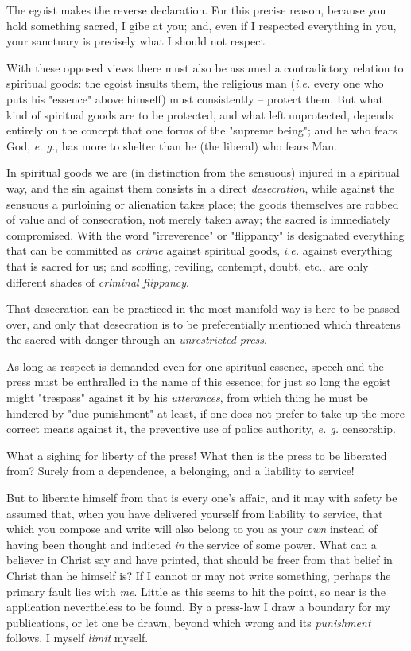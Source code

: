 The egoist makes the reverse declaration. For this precise reason, because you 
hold something sacred, I gibe at you; and, even if I respected everything in 
you, your sanctuary is precisely what I should not respect.

With these opposed views there must also be assumed a contradictory relation 
to spiritual goods: the egoist insults them, the religious man (\textit{i.e.} 
every one who puts his "{}essence"{} above himself) must consistently -- 
protect them. But what kind of spiritual goods are to be protected, and what 
left unprotected, depends entirely on the concept that one forms of the 
"{}supreme being"{}; and he who fears God, \textit{e. g.}, has more to shelter 
than he (the liberal) who fears Man.

In spiritual goods we are (in distinction from the sensuous) injured in a 
spiritual way, and the sin against them consists in a direct 
\textit{desecration}, while against the sensuous a purloining or alienation 
takes place; the goods themselves are robbed of value and of consecration, not 
merely taken away; the sacred is immediately compromised. With the word 
"{}irreverence"{} or "{}flippancy"{} is designated everything that can be 
committed as \textit{crime} against spiritual goods, \textit{i.e.} against 
everything that is sacred for us; and scoffing, reviling, contempt, doubt, 
etc., are only different shades of \textit{criminal flippancy}.

That desecration can be practiced in the most manifold way is here to be 
passed over, and only that desecration is to be preferentially mentioned which 
threatens the sacred with danger through an \textit{unrestricted press}.

As long as respect is demanded even for one spiritual essence, speech and the 
press must be enthralled in the name of this essence; for just so long the 
egoist might "{}trespass"{} against it by his \textit{utterances}, from which 
thing he must be hindered by "{}due punishment"{} at least, if one does not 
prefer to take up the more correct means against it, the preventive use of 
police authority, \textit{e. g.} censorship.

What a sighing for liberty of the press! What then is the press to be 
liberated from? Surely from a dependence, a belonging, and a liability to 
service!

But to liberate himself from that is every one's affair, and it may with 
safety be assumed that, when you have delivered yourself from liability to 
service, that which you compose and write will also belong to you as your 
\textit{own} instead of having been thought and indicted \textit{in} the 
service of some power. What can a believer in Christ say and have printed, 
that should be freer from that belief in Christ than he himself is? If I 
cannot or may not write something, perhaps the primary fault lies with 
\textit{me}. Little as this seems to hit the point, so near is the application 
nevertheless to be found. By a press-law I draw a boundary for my 
publications, or let one be drawn, beyond which wrong and its 
\textit{punishment} follows. I myself \textit{limit} myself.

